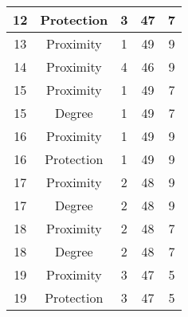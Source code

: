 \documentclass[results.tex]{subfiles}
\begin{document}
\begin{center}
\begin{tabular}{| c || c | c | c | c |}
            \hline
            12                      & Protection                   & 3                      & 47                      & 7                    \\
            \hline
            13                      & Proximity                    & 1                      & 49                      & 9                    \\
            \hline
            14                      & Proximity                    & 4                      & 46                      & 9                    \\
            \hline
            15                      & Proximity                    & 1                      & 49                      & 7                    \\
            \hline
            15                      & Degree                       & 1                      & 49                      & 7                    \\
            \hline
            16                      & Proximity                    & 1                      & 49                      & 9                    \\
            \hline
            16                      & Protection                   & 1                      & 49                      & 9                    \\
            \hline
            17                      & Proximity                    & 2                      & 48                      & 9                    \\
            \hline
            17                      & Degree                       & 2                      & 48                      & 9                    \\
            \hline
            18                      & Proximity                    & 2                      & 48                      & 7                    \\
            \hline
            18                      & Degree                       & 2                      & 48                      & 7                    \\
            \hline
            19                      & Proximity                    & 3                      & 47                      & 5                    \\
            \hline
            19                      & Protection                   & 3                      & 47                      & 5                    \\

\end{tabular}
\end{center}
\end{document}
